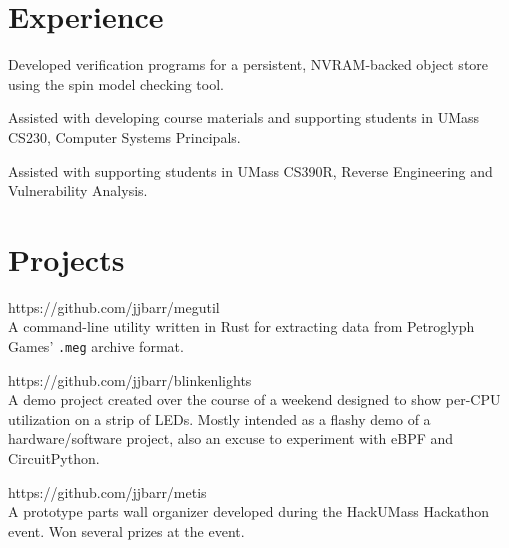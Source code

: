 \documentclass[]{deedy-resume-openfont}
\begin{document}
\begin{minipage}[t]{0.66\textwidth} 


\section{Experience}

\vspace{\topsep}
\begin{tightemize}
\item Developed verification programs for a persistent, NVRAM-backed object
  store using the spin model checking tool.
\end{tightemize}
\vspace{\topsep}
\begin{tightemize}
\item Assisted with developing course materials and supporting students in UMass
  CS230, Computer Systems Principals.
\end{tightemize}
\vspace{\topsep}
\begin{tightemize}
\item Assisted with supporting students in UMass CS390R, Reverse Engineering and
  Vulnerability Analysis.
\end{tightemize}
\sectionsep{}

\section{Projects}
 https://github.com/jjbarr/megutil \\
A command-line utility written in Rust for extracting data from Petroglyph
Games' \texttt{.meg} archive format.
\sectionsep{}

 https://github.com/jjbarr/blinkenlights \\
A demo project created over the course of a weekend designed to show per-CPU
utilization on a strip of LEDs. Mostly intended as a flashy demo of a
hardware/software project, also an excuse to experiment with eBPF and CircuitPython.
\sectionsep{}

 https://github.com/jjbarr/metis  \\
A prototype parts wall organizer developed during the HackUMass Hackathon
event. Won several prizes at the event.

\end{minipage} 
\end{document}
